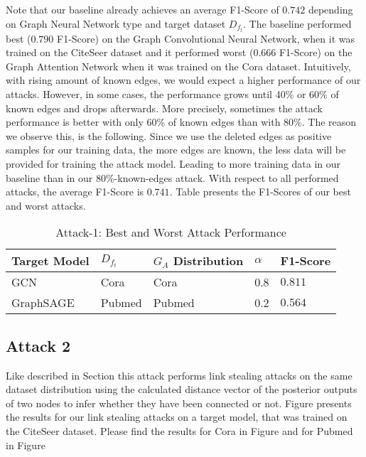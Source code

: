             Note that our baseline already achieves an average F1-Score of $0.742$ depending on Graph Neural Network type and target dataset $D_{f_t}$.
            The baseline performed best ($0.790$ F1-Score) on the Graph Convolutional Neural Network, when it was trained on the  CiteSeer dataset and it performed worst ($0.666$ F1-Score) on the Graph Attention Network when it was trained on the Cora dataset.
            Intuitively, with rising amount of known edges, we would expect a higher performance of our attacks.
            However, in some cases, the performance grows until 40\% or 60\% of known edges and drops afterwards.
            More precisely, sometimes the attack performance is better with only 60\% of known edges than with 80\%.
            The reason we observe this, is the following. 
            Since we use the deleted edges as positive samples for our training data, the more edges are known, the less data will be provided for training the attack model. 
            Leading to more training data in our baseline than in our 80\%-known-edges attack.
            With respect to all performed attacks, the average F1-Score is $0.741$.
            Table  presents the F1-Scores of our best and worst attacks.

            \vspace{0.48cm}
            \begin{table}[!h]
                \centering
                \footnotesize
                \begin{tabular}{l|l|l|l|l|}
                \toprule
                Target Model & $D_{f_t}$ & $G_A$ Distribution & $\alpha$ & F1-Score \\
                \midrule
                GCN       & Cora   & Cora   & 0.8 & $0.811$ \\
                GraphSAGE & Pubmed & Pubmed & 0.2 & $0.564$ \\
                
                \bottomrule
                \end{tabular}
                \caption{Attack-1: Best and Worst Attack Performance}
                \label{table:attack1-best-and-worst-performance}
            \end{table}

        \subsection*{Attack 2}
            Like described in Section  this attack performs link stealing attacks on the same dataset distribution using the calculated distance vector of the posterior outputs of two nodes to infer whether they have been connected or not. 
            Figure  presents the results for our link stealing attacks on a target model, that was trained on the CiteSeer dataset.
            Please find the results for Cora in Figure  and for Pubmed in Figure 

